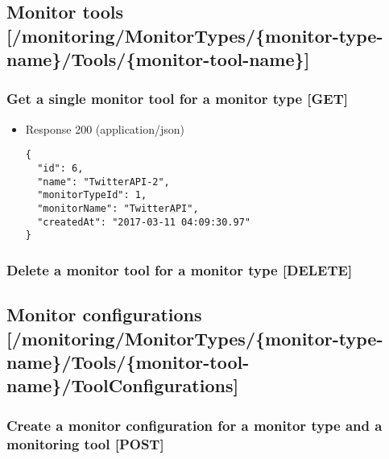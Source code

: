 \subsection{Monitor tools
{[}/monitoring/MonitorTypes/\{monitor-type-name\}/Tools/\{monitor-tool-name\}{]}}\label{monitor-tools-monitoringmonitortypesmonitor-type-nametoolsmonitor-tool-name}

\subsubsection{Get a single monitor tool for a monitor type
{[}GET{]}}\label{get-a-single-monitor-tool-for-a-monitor-type-get}

\begin{itemize}
\item
   Response 200 (application/json)

\begin{verbatim}
{
  "id": 6,
  "name": "TwitterAPI-2",
  "monitorTypeId": 1,
  "monitorName": "TwitterAPI",
  "createdAt": "2017-03-11 04:09:30.97"
}
\end{verbatim}
\end{itemize}

\subsubsection{Delete a monitor tool for a monitor type
{[}DELETE{]}}\label{delete-a-monitor-tool-for-a-monitor-type-delete}

\subsection{Monitor configurations
{[}/monitoring/MonitorTypes/\{monitor-type-name\}/Tools/\{monitor-tool-name\}/ToolConfigurations{]}}\label{monitor-configurations-monitoringmonitortypesmonitor-type-nametoolsmonitor-tool-nametoolconfigurations}

\subsubsection{Create a monitor configuration for a monitor type and a
monitoring tool
{[}POST{]}}\label{create-a-monitor-configuration-for-a-monitor-type-and-a-monitoring-tool-post}

